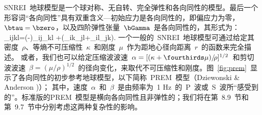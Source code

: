 SNREI~地球模型是一个球对称、无自转、完全弹性和各向同性的模型。最后一个形容词“各向同性”具有双重含义---初始应力是各向同性的，即偏应力为零，$\btau=\bzero$，以及四阶弹性张量~$\bGamma$~是各向同性的，其形式为：
%
%
\eq \label{eq:8.firsteqn}
\Gamma_{ijkl}=(\kappa-\twothirds\mu)\delta_{ij}\delta_{kl}
+\mu(\delta_{ik}\delta_{jl}+\delta_{il}\delta_{jk}).
\en
一个一般的~SNREI~地球模型可通过给定其密度~$\rho$、等熵不可压缩性~$\kappa$~和刚度~$\mu$~作为距地心径向距离~$r$~的函数来完全描述。
%
%
%
%
%
%
或者，我们也可以给定压缩波波速~$\alpha=[(\kappa+\fourthirds\mu)/\!\rho]^{1/2}$~和剪切波波速~$\beta=(\mu/\!\rho)^{1/2}$~的径向变化，来取代不可压缩性和刚度。图~\ref{fig:prem}~显示了各向同性的初步参考地球模型，以下简称~PREM~模型（Dziewonski \& Anderson \citeyear{dziewonski&anderson81})）；
%
%
%
%
%
%
%
%
其中，速度~$\alpha$~和~$\beta$~是由频率为~1 Hz~的~P~波或~S~波所“感受到的”。标准版的PREM~模型是横向各向同性且非弹性的；我们将在第~8.9~节和第~9.7~节中分别考虑这两种复杂性的影响。

